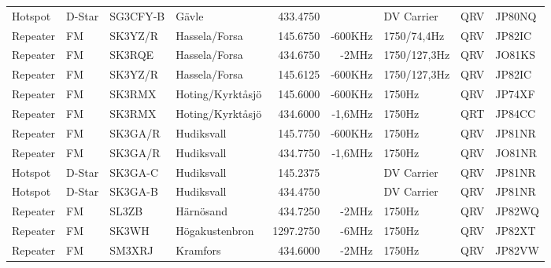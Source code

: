 \documentclass[10pt,swedish,a4paper,twoside]{article}
\begin{document}
\begin{landscape}
\begin{longtable}{llllrrlcl}
	Hotspot           & D-Star       & SG3CFY-B      & Gävle            &          433.4750 &                & DV Carrier      &       QRV       & JP80NQ           \\
	Repeater          & FM           & SK3YZ/R       & Hassela/Forsa    &          145.6750 &        -600KHz & 1750/74,4Hz     &       QRV       & JP82IC           \\
	Repeater          & FM           & SK3RQE        & Hassela/Forsa    &          434.6750 &          -2MHz & 1750/127,3Hz    &       QRV       & JO81KS           \\
	Repeater          & FM           & SK3YZ/R       & Hassela/Forsa    &          145.6125 &        -600KHz & 1750/127,3Hz    &       QRV       & JP82IC           \\
	Repeater          & FM           & SK3RMX        & Hoting/Kyrktåsjö &          145.6000 &        -600KHz & 1750Hz          &       QRV       & JP74XF           \\
	Repeater          & FM           & SK3RMX        & Hoting/Kyrktåsjö &          434.6000 &        -1,6MHz & 1750Hz          &       QRT       & JP84CC           \\
	Repeater          & FM           & SK3GA/R       & Hudiksvall       &          145.7750 &        -600KHz & 1750Hz          &       QRV       & JP81NR           \\
	Repeater          & FM           & SK3GA/R       & Hudiksvall       &          434.7750 &        -1,6MHz & 1750Hz          &       QRV       & JO81NR           \\
	Hotspot           & D-Star       & SK3GA-C       & Hudiksvall       &          145.2375 &                & DV Carrier      &       QRV       & JP81NR           \\
	Hotspot           & D-Star       & SK3GA-B       & Hudiksvall       &          434.4750 &                & DV Carrier      &       QRV       & JP81NR           \\
	Repeater          & FM           & SL3ZB         & Härnösand        &          434.7250 &          -2MHz & 1750Hz          &       QRV       & JP82WQ           \\
	Repeater          & FM           & SK3WH         & Högakustenbron   &         1297.2750 &          -6MHz & 1750Hz          &       QRV       & JP82XT           \\
	Repeater          & FM           & SM3XRJ        & Kramfors         &          434.6000 &          -2MHz & 1750Hz          &       QRV       & JP82VW           \\

\end{longtable}
\end{landscape}
\end{document}
